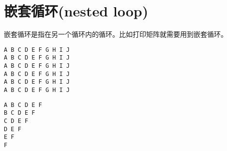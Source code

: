 \section{嵌套循环(nested loop)}
\begin{frame}[fragile]\ft{\secname}
嵌套循环是指在另一个循环内的循环。比如打印矩阵就需要用到嵌套循环。
\end{frame}

\begin{frame}\ft{\secname}


\end{frame}

\begin{frame}[fragile]\ft{\secname}
 \begin{lstlisting}[backgroundcolor=\color{red!10}]
A B C D E F G H I J 
A B C D E F G H I J 
A B C D E F G H I J 
A B C D E F G H I J 
A B C D E F G H I J 
A B C D E F G H I J 
\end{lstlisting}
\end{frame}

\begin{frame}\ft{\secname}


\end{frame}

\begin{frame}[fragile]\ft{\secname}
 \begin{lstlisting}
A B C D E F 
B C D E F 
C D E F 
D E F 
E F 
F 
\end{lstlisting}
\end{frame}

